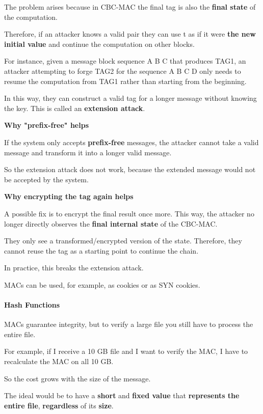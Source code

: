 \documentclass{article}
\begin{document}
The problem arises because in CBC-MAC the final tag is also the \textbf{final state} of the computation.

Therefore, if an attacker knows a valid pair they can use t as if it were \textbf{the new initial value} and continue the computation on other blocks.

For instance, given a message block sequence A B C that produces TAG1, an attacker attempting to forge TAG2 for the sequence A B C D only needs to resume the computation from TAG1 rather than starting from the beginning.

In this way, they can construct a valid tag for a longer message without knowing the key. This is called an \textbf{extension attack}.

\textbf{Why "prefix-free" helps}

If the system only accepts \textbf{prefix-free} messages, the attacker cannot take a valid message and transform it into a longer valid message.

So the extension attack does not work, because the extended message would not be accepted by the system.

\textbf{Why encrypting the tag again helps}

A possible fix is to encrypt the final result once more. This way, the attacker no longer directly observes the \textbf{final internal state} of the CBC-MAC.

They only see a transformed/encrypted version of the state. Therefore, they cannot reuse the tag as a starting point to continue the chain.

In practice, this breaks the extension attack.

MACs can be used, for example, as cookies or as SYN cookies.

\paragraph*{Hash Functions}

MACs guarantee integrity, but to verify a large file you still have to process the entire file.

For example, if I receive a 10 GB file and I want to verify the MAC, I have to recalculate the MAC on all 10 GB.

So the cost grows with the size of the message.

The ideal would be to have a \textbf{short} and \textbf{fixed value} that \textbf{represents the entire file}, \textbf{regardless} of its \textbf{size}.
\end{document}
